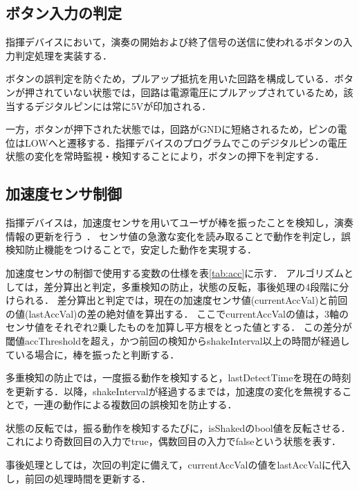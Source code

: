 \documentclass[lualatex,book,paper=a4paper,jafontsize=11.5pt,jafontscale=1.05]{jlreq}
\begin{document}
\subsection{ボタン入力の判定}
指揮デバイスにおいて，演奏の開始および終了信号の送信に使われるボタンの入力判定処理を実装する．

ボタンの誤判定を防ぐため，プルアップ抵抗を用いた回路を構成している．ボタンが押されていない状態では，回路は電源電圧にプルアップされているため，該当するデジタルピンには常に5Vが印加される．

一方，ボタンが押下された状態では，回路がGNDに短絡されるため，ピンの電位はLOWへと遷移する．指揮デバイスのプログラムでこのデジタルピンの電圧状態の変化を常時監視・検知することにより，ボタンの押下を判定する．
\subsection{加速度センサ制御}
指揮デバイスは，加速度センサを用いてユーザが棒を振ったことを検知し，演奏情報の更新を行う
．
センサ値の急激な変化を読み取ることで動作を判定し，誤検知防止機能をつけることで，安定した動作を実現する．

加速度センサの制御で使用する変数の仕様を表\ref{tab:acc}に示す．
アルゴリズムとしては，差分算出と判定，多重検知の防止，状態の反転，事後処理の4段階に分けられる．
差分算出と判定では，現在の加速度センサ値(currentAccVal)と前回の値(lastAccVal)の差の絶対値を算出する．
ここでcurrentAccValの値は，3軸のセンサ値をそれぞれ2乗したものを加算し平方根をとった値とする．
この差分が閾値accThresholdを超え，かつ前回の検知からshakeInterval以上の時間が経過している場合に，棒を振ったと判断する．

多重検知の防止では，一度振る動作を検知すると，lastDetectTimeを現在の時刻を更新する．以降，shakeIntervalが経過するまでは，加速度の変化を無視することで，一連の動作による複数回の誤検知を防止する．

状態の反転では，振る動作を検知するたびに，isShakedのbool値を反転させる．これにより奇数回目の入力でtrue，偶数回目の入力でfalseという状態を表す．

事後処理としては，次回の判定に備えて，currentAccValの値をlastAccValに代入し，前回の処理時間を更新する．

\end{document}
